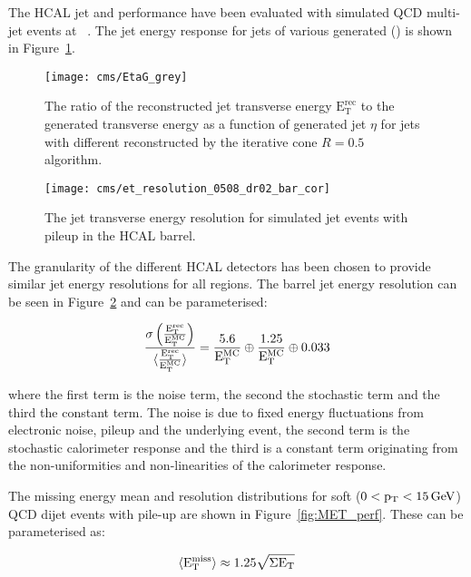 The HCAL jet and \MET performance have been evaluated with simulated QCD multi-jet events at \lowlumi~\cite{CMS_TDR_PHYS_vol1}. The jet energy response for jets of various generated \ET (\ETMC) is shown in Figure~\ref{fig:jet_scale}.

\begin{figure}[bt]
   \centering
    \texttt{[image: cms/EtaG\_grey]}
    \caption{The ratio of the reconstructed jet transverse energy $\mathrm{E_{T}^{rec}}$ 
      to the generated transverse energy \ETMC
      as a function of generated jet $\eta$ for jets with
      different \ETMC reconstructed by the iterative cone
      $R=0.5$ algorithm.~\cite{CMS_TDR_PHYS_vol1}}
    \label{fig:jet_scale}
\end{figure}

\begin{figure}[hbt]
  \centering
  \texttt{[image: cms/et\_resolution\_0508\_dr02\_bar\_cor]}
  \caption{The jet transverse energy resolution for simulated jet events with pileup in the HCAL barrel.~\cite{CMS_TDR_PHYS_vol1}
  \label{fig:Jet_perf}}
\end{figure}

The granularity of the different HCAL detectors has been chosen to provide similar jet energy resolutions for all regions. The barrel jet energy resolution can be seen in Figure~\ref{fig:Jet_perf} and can be parameterised: 

\begin{equation}
\mathrm{\frac{\sigma\left(\frac{E_{\rm T}^{\rm rec}}{E_{\rm T}^{\rm MC}}\right)}{\langle\frac{E_{\rm
      T}^{\rm rec}}{E_{\rm T}^{\rm MC}}\rangle}=\frac{5.6}{\mathrm{E_{T}^{MC}}} \oplus
      \frac{1.25}{\mathrm{E_{T}^{MC}}} \oplus 0.033}
\end{equation}

where the first term is the noise term, the second the stochastic term and the third the constant term. The noise is due to fixed energy fluctuations from electronic noise, pileup and the underlying event, the second term is the stochastic calorimeter response and the third is a constant term originating from the non-uniformities and non-linearities of the calorimeter response.

The missing energy \MET mean and resolution distributions for soft ($0 < \mathrm{p_{T}} < 15 \,\mathrm{Ge\hspace{-.08em}V}$) QCD dijet events with pile-up are shown in Figure~\ref{fig:MET_perf}. These can be parameterised as:

\begin{equation}
 \langle\mathrm{E_{T}^{miss}}\rangle \approx 1.25 \sqrt{ \Sigma \mathrm{E_{\mathrm{T}}}}
 \label{eqn:MET_mean}
\end{equation}

